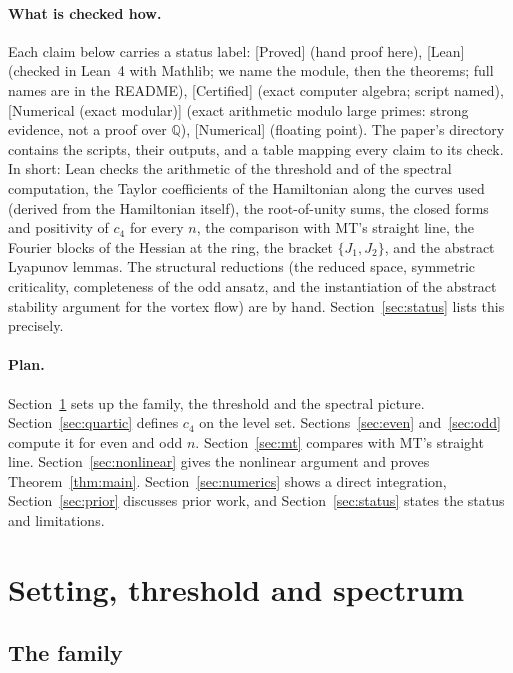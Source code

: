 \documentclass[11pt]{article}
\numberwithin{equation}{section}
\theoremstyle{definition}
\theoremstyle{remark}
\newcommand{\status}[1]{\textsf{[#1]}}
\begin{document}
\paragraph{What is checked how.} Each claim below carries a status label: \status{Proved} (hand proof
here), \status{Lean} (checked in Lean~4 with Mathlib; we name the module, then the theorems; full
names are in the README),
\status{Certified} (exact computer algebra; script named), \status{Numerical (exact modular)} (exact
arithmetic modulo large primes: strong evidence, not a proof over $\mathbb Q$), \status{Numerical}
(floating point). The paper's directory contains the scripts, their outputs, and a table mapping every
claim to its check. In short: Lean checks the arithmetic of the threshold and of the spectral
computation, the Taylor coefficients of the Hamiltonian along the curves used (derived from the Hamiltonian
itself), the root-of-unity sums, the closed forms and positivity of $c_4$ for every $n$, the comparison
with MT's straight line, the Fourier blocks of the Hessian at the ring, the bracket $\{J_1,J_2\}$, and the
abstract Lyapunov lemmas. The structural reductions (the reduced space, symmetric criticality,
completeness of the odd ansatz, and the instantiation of the abstract stability argument for the vortex
flow) are by hand. Section~\ref{sec:status} lists this precisely.

\paragraph{Plan.} Section~\ref{sec:setup} sets up the family, the threshold and the spectral picture.
Section~\ref{sec:quartic} defines $c_4$ on the level set. Sections~\ref{sec:even} and~\ref{sec:odd}
compute it for even and odd $n$. Section~\ref{sec:mt} compares with MT's straight line.
Section~\ref{sec:nonlinear} gives the nonlinear argument and proves Theorem~\ref{thm:main}.
Section~\ref{sec:numerics} shows a direct integration, Section~\ref{sec:prior} discusses prior work, and
Section~\ref{sec:status} states the status and limitations.

\section{Setting, threshold and spectrum}\label{sec:setup}

\subsection{The family}
\end{document}
